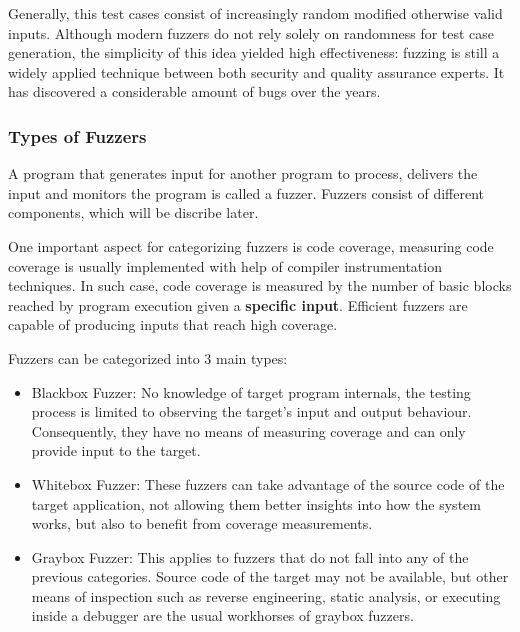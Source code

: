 Generally, this test cases consist of increasingly random modified otherwise valid inputs. Although modern
fuzzers do not rely solely on randomness for test case generation, the simplicity of this idea yielded high
effectiveness: fuzzing is still a widely applied technique between both security and quality assurance experts.
It has discovered a considerable amount of bugs over the years.



\subsubsection{Types of Fuzzers}

A program that generates input for another program to process, delivers the input and monitors the program
is called a fuzzer. Fuzzers consist of different components, which will be discribe later.

One important aspect for categorizing fuzzers is code coverage, measuring code coverage is usually implemented
with help of compiler instrumentation techniques. In such case, code coverage is measured by the number of
basic blocks reached by program execution given a \textbf{specific input}. Efficient fuzzers are capable of producing inputs that reach high coverage.

Fuzzers can be categorized into 3 main types:

\begin{itemize}
    \item Blackbox Fuzzer: No knowledge of target program internals, the testing process is limited to observing the target's input and output behaviour. Consequently, they have no means of measuring coverage and can only provide input to the target.
    \item Whitebox Fuzzer: These fuzzers can take advantage of the source code of the target application, not allowing them better insights into how the system works, but also to benefit from coverage measurements.
    \item Graybox Fuzzer: This applies to fuzzers that do not fall into any of the previous categories. Source code of the target may not be available, but other means of inspection such as reverse engineering, static analysis, or executing inside a debugger are the usual workhorses of graybox fuzzers\cite{mcnallyFuzzingStateArt2012}.
\end{itemize}


